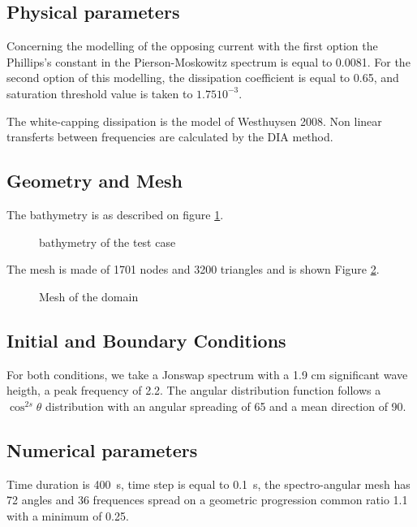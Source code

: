\subsection{Physical parameters}
 Concerning the modelling of the opposing current with the first option the Phillips’s constant in the Pierson-Moskowitz spectrum is equal to 0.0081.
For the second option of this modelling, the dissipation coefficient is equal to 0.65, and saturation threshold value is taken to $1.75 10^{-3}$.

The white-capping dissipation is the model of Westhuysen 2008. Non linear transferts between frequencies are calculated by the DIA method.

%
%
%
\subsection{Geometry and Mesh}
%
The bathymetry is as described on figure \ref{bathyop}.
\begin{figure} [!h]
\centering
{}
 \caption{bathymetry of the test case }
\label{bathyop}
\end{figure}

The mesh is made of 1701 nodes and 3200 triangles  and is shown Figure \ref{mailop}.
\begin{figure} [!h]
\centering
{}
 \caption{Mesh of the domain}
\label{mailop}
\end{figure}




%
%
\subsection{Initial and Boundary Conditions}
%
For both conditions, we take a Jonswap spectrum with a 1.9 cm significant wave heigth, a peak frequency of 2.2. The angular distribution function follows a $\cos^{2s} \theta$ distribution with an angular spreading of 65 and a mean direction of 90.
%
%
\subsection{Numerical parameters}
%
Time duration is 400~s, time step is equal to 0.1~s, the spectro-angular mesh has 72 angles and 36 frequences spread on a geometric progression common ratio 1.1 with a minimum of 0.25.


